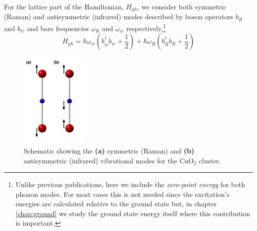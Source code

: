 For the lattice  part of the Hamiltonian, $H_{ph}$, we consider both symmetric (Raman) and antisymmetric (infrared) modes described by boson operators $b_R$ and $b_{ir}$ and bare frequencies $\omega_R$ and $\omega_{ir}$ respectively,\footnote{Unlike previous publications, here we include the \textit{zero-point energy} for both phonon modes. 
For most cases this is not needed since the excitation's energies are calculated relative to the ground state but, in chapter \ref{chap:ground} we study the ground state energy itself where this contribution is important.}
%
\begin{equation}
 \label{eq:phonon-part}
 H_{ph} = \hbar \omega_{ir}\left(b_{ir}^\dagger b_{ir}+\frac{1}{2}\right) + \hbar \omega_R \left( b_R^\dagger b_R + \frac{1}{2}\right)
\end{equation}
%
\begin{figure}[ht]
  \centering
  \includegraphics[width=0.3\textwidth]{images/CuO2-vibrations.png}
  \caption[Schematic for the symmetric (Raman) and antisymmetric (infrared) vibrational modes in CuO$_2$.]
  {Schematic showing the \textbf{(a)} symmetric (Raman) and \textbf{(b)} antisymmetric (infrared) vibrational modes for the CuO$_2$ cluster.}
  \label{fig:CO2-vibrations}
\end{figure}

